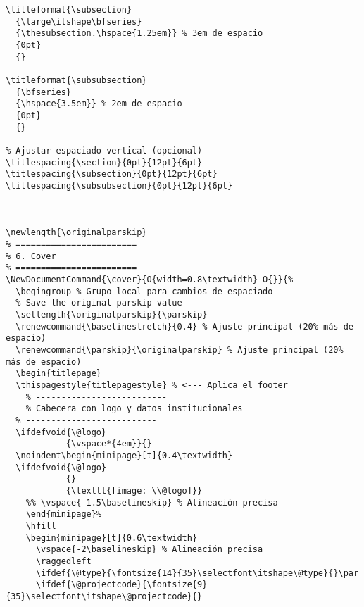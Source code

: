 \documentclass{reporti}
\begin{document}
\begin{verbatim}
\titleformat{\subsection}
  {\large\itshape\bfseries}
  {\thesubsection.\hspace{1.25em}} % 3em de espacio
  {0pt}
  {}

\titleformat{\subsubsection}
  {\bfseries}
  {\hspace{3.5em}} % 2em de espacio
  {0pt}
  {}

% Ajustar espaciado vertical (opcional)
\titlespacing{\section}{0pt}{12pt}{6pt}
\titlespacing{\subsection}{0pt}{12pt}{6pt}
\titlespacing{\subsubsection}{0pt}{12pt}{6pt}



\newlength{\originalparskip}
% ========================
% 6. Cover
% ========================
\NewDocumentCommand{\cover}{O{width=0.8\textwidth} O{}}{%
  \begingroup % Grupo local para cambios de espaciado
  % Save the original parskip value
  \setlength{\originalparskip}{\parskip}
  \renewcommand{\baselinestretch}{0.4} % Ajuste principal (20% más de espacio)
  \renewcommand{\parskip}{\originalparskip} % Ajuste principal (20% más de espacio)
  \begin{titlepage}
  \thispagestyle{titlepagestyle} % <--- Aplica el footer
    % --------------------------
    % Cabecera con logo y datos institucionales
  % --------------------------
  \ifdefvoid{\@logo}
            {\vspace*{4em}}{}
  \noindent\begin{minipage}[t]{0.4\textwidth}
  \ifdefvoid{\@logo}
            {}
            {\texttt{[image: \\@logo]}}
    %% \vspace{-1.5\baselineskip} % Alineación precisa
    \end{minipage}%
    \hfill
    \begin{minipage}[t]{0.6\textwidth}
      \vspace{-2\baselineskip} % Alineación precisa
      \raggedleft
      \ifdef{\@type}{\fontsize{14}{35}\selectfont\itshape\@type}{}\par
      \ifdef{\@projectcode}{\fontsize{9}{35}\selectfont\itshape\@projectcode}{}


\end{verbatim}
\end{document}
